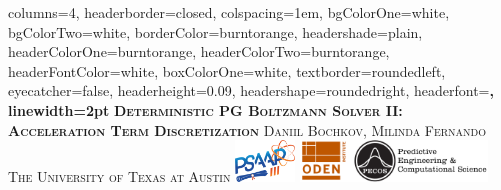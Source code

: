 \documentclass[landscape,archE,fontscale=0.285]{baposter} %
\begin{document}
\begin{poster}
{
columns=4, %
headerborder=closed, %
colspacing=1em, %
bgColorOne=white, %
bgColorTwo=white, %
borderColor=burntorange, %
headershade=plain,
headerColorOne=burntorange, %
headerColorTwo=burntorange, %
headerFontColor=white, %
boxColorOne=white, %
textborder=roundedleft, %
eyecatcher=false, %
headerheight=0.09\textheight, %
headershape=roundedright, %
headerfont=\Large\bf\textsc, %
linewidth=2pt %
}
%
{}
{\bf\textsc{Deterministic PG Boltzmann Solver II: \\{Acceleration Term Discretization} }\vspace{0.5em}} %
{\textsc{Daniil Bochkov, Milinda Fernando \hspace{12pt} The University of Texas at Austin}} %
{%
%
\hspace{12pt} \includegraphics[align=c,height=3em]{psaap3-logo.png}%
\hspace{12pt} \includegraphics[align=c,height=3em]{oden_pecos_2020_wordmark.png}%
}


\end{poster}
\end{document}
